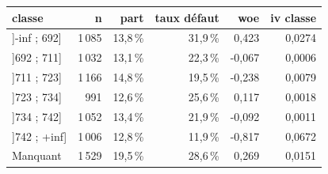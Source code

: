\begin{tabular}{lrrrrr}
\toprule
\textbf{classe} & \textbf{n} & \textbf{part} & \textbf{taux défaut} & \textbf{woe} & \textbf{iv classe} \\
\midrule
]-inf ; 692] & 1\,085 & 13,8\,\% & 31,9\,\% & 0,423 & 0,0274 \\
]692 ; 711] & 1\,032 & 13,1\,\% & 22,3\,\% & -0,067 & 0,0006 \\
]711 ; 723] & 1\,166 & 14,8\,\% & 19,5\,\% & -0,238 & 0,0079 \\
]723 ; 734] & 991 & 12,6\,\% & 25,6\,\% & 0,117 & 0,0018 \\
]734 ; 742] & 1\,052 & 13,4\,\% & 21,9\,\% & -0,092 & 0,0011 \\
]742 ; +inf] & 1\,006 & 12,8\,\% & 11,9\,\% & -0,817 & 0,0672 \\
Manquant & 1\,529 & 19,5\,\% & 28,6\,\% & 0,269 & 0,0151 \\
\bottomrule
\end{tabular}
